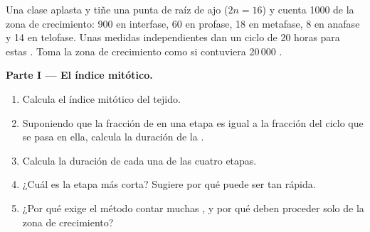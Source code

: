 \begin{problem}
\label{pb:g11:cell-cycle-mitosis:1}
Una clase aplasta y tiñe una punta de raíz de ajo ($2n = 16$) y cuenta
1000  de la zona de crecimiento: 900 en interfase, 60 en
profase, 18 en metafase, 8 en anafase y 14 en telofase. Unas medidas
independientes dan un ciclo de 20 horas para estas . Toma la
zona de crecimiento como si contuviera 20\,000 .

\medskip
\noindent\textbf{Parte I --- El índice mitótico.}
\begin{enumerate}
  \item Calcula el índice mitótico del tejido.
  \item Suponiendo que la fracción de  en una etapa es igual a
        la fracción del ciclo que se pasa en ella, calcula la duración
        de la .
  \item Calcula la duración de cada una de las cuatro etapas.
  \item ¿Cuál es la etapa más corta? Sugiere por qué puede ser tan
        rápida.
  \item ¿Por qué exige el método contar muchas , y por qué deben
        proceder solo de la zona de crecimiento?
\end{enumerate}


\end{problem}
